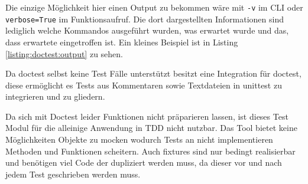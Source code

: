 Die einzige Möglichkeit hier einen Output zu bekommen wäre mit \lstinline{-v} im CLI oder
\lstinline{verbose=True} im Funktionsaufruf. Die dort dargestellten Informationen sind
lediglich welche Kommandos ausgeführt wurden, was erwartet wurde und das, dass erwartete
eingetroffen ist. Ein kleines Beispiel ist in Listing \ref{listing:doctest:output} zu sehen.

Da doctest selbst keine Test Fälle unterstützt besitzt  eine
Integration für doctest, diese ermöglicht es Tests aus Kommentaren sowie Textdateien in
unittest zu integrieren und zu gliedern.

Da sich mit Doctest leider Funktionen nicht präparieren lassen, ist dieses Test Modul für die
alleinige Anwendung in TDD nicht nutzbar. Das Tool bietet keine Möglichkeiten Objekte zu \gls{mock}en
wodurch Tests an nicht implementieren Methoden und Funktionen scheitern. Auch \Glspl{fixture} sind
nur bedingt realisierbar und benötigen viel Code der dupliziert werden muss, da dieser vor und nach
jedem Test geschrieben werden muss.